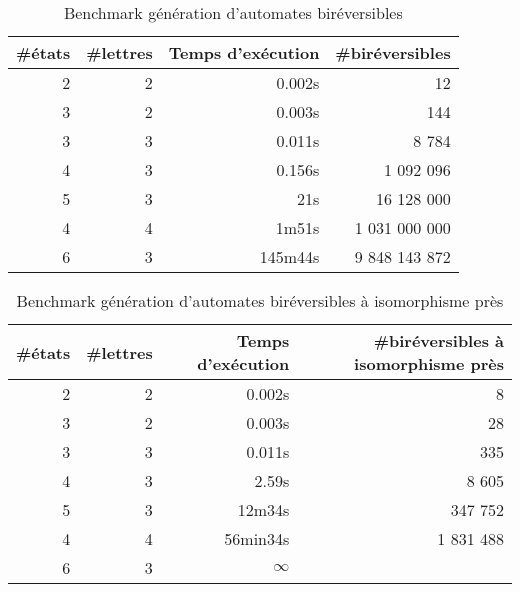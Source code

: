 \documentclass[11pt,a4paper]{article}
\begin{document}
\begin{table}[h!]
  \begin{center}
    \begin{threeparttable}
      \begin{tabular}{|rrrr|}
        \hline
        \#états & \#lettres & Temps d'exécution & \#biréversibles \\ [0.5ex]
        \hline\hline
        2 & 2 & 0.002s & 12 \\
        \hline
        3 & 2 & 0.003s & 144 \\
        \hline
        3 & 3 & 0.011s & 8 784 \\
        \hline
        4 & 3 & 0.156s & 1 092 096 \\
        \hline
        5 & 3 & 21s    & 16 128 000 \\
        \hline
        4 & 4 & 1m51s  & 1 031 000 000 \\
        \hline
        6 & 3 & 145m44s& 9 848 143 872 \\
        \hline
      \end{tabular}

      \caption{Benchmark génération d'automates biréversibles}
    \end{threeparttable}
  \end{center}
\end{table}


\begin{table}[h!]
  \begin{center}
    \begin{threeparttable}
      \begin{tabular}{|rrrr|}
        \hline
        \#états & \#lettres & Temps d'exécution & \#biréversibles à isomorphisme près\\ [0.5ex]
        \hline\hline
        2 & 2 & 0.002s & 8 \\
        \hline
        3 & 2 & 0.003s & 28 \\
        \hline
        3 & 3 & 0.011s & 335  \\
        \hline
        4 & 3 & 2.59s & 8 605 \\
        \hline
        5 & 3 & 12m34s    & 347 752 \\
        \hline
        4 & 4 & 56min34s  & 1 831 488 \\
        \hline
        6 & 3 & $\infty$  &  \\
        \hline
      \end{tabular}

      \caption{Benchmark génération d'automates biréversibles à isomorphisme près\label{table:birev-iso}}
    \end{threeparttable}
  \end{center}
\end{table}
\end{document}
